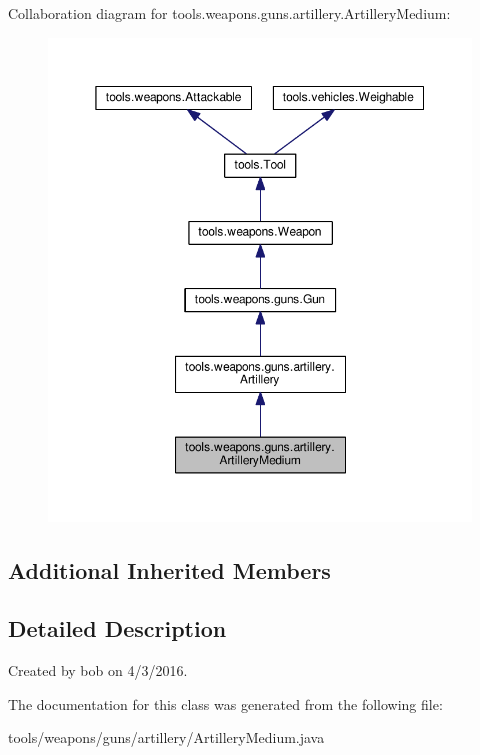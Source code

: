 Collaboration diagram for tools.\+weapons.\+guns.\+artillery.\+Artillery\+Medium\+:
\nopagebreak
\begin{figure}[H]
\begin{center}
\leavevmode
\includegraphics[width=350pt]{classtools_1_1weapons_1_1guns_1_1artillery_1_1_artillery_medium__coll__graph}
\end{center}
\end{figure}
\subsection*{Additional Inherited Members}


\subsection{Detailed Description}
Created by bob on 4/3/2016. 

The documentation for this class was generated from the following file\+:\begin{DoxyCompactItemize}
\item 
tools/weapons/guns/artillery/Artillery\+Medium.\+java\end{DoxyCompactItemize}
